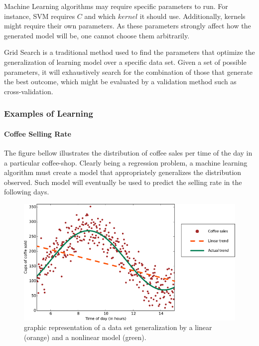 \documentclass[12pt]{article}
\begin{document}
Machine Learning algorithms may require specific parameters to run. For instance, SVM requires $C$ and which $kernel$ it should use. Additionally, kernels might require their own parameters. As these parameters strongly affect how the generated model will be, one cannot choose them arbitrarily.

Grid Search is a traditional method used to find the parameters that optimize the generalization of learning model over a specific data set. \cite{gridsearch} Given a set of possible parameters, it will exhaustively search for the combination of those that generate the best outcome, which might be evaluated by a validation method such as cross-validation.

\subsubsection{Examples of Learning}

\paragraph{Coffee Selling Rate}

The figure bellow illustrates the distribution of coffee sales per time of the day in a particular coffee-shop. \cite{roh2015} Clearly being a regression problem, a machine learning algorithm must create a model that appropriately generalizes the distribution observed. Such model will eventually be used to predict the selling rate in the following days.

\begin{figure}[H]
	\centering
	\captionsetup{justification=centering}

	\includegraphics[scale=.6]{rohrer2015}
	\caption{graphic representation of a data set generalization by a linear (orange) and a nonlinear model (green).}
	\label{fig:rohrer2015}
\end{figure}
\end{document}

